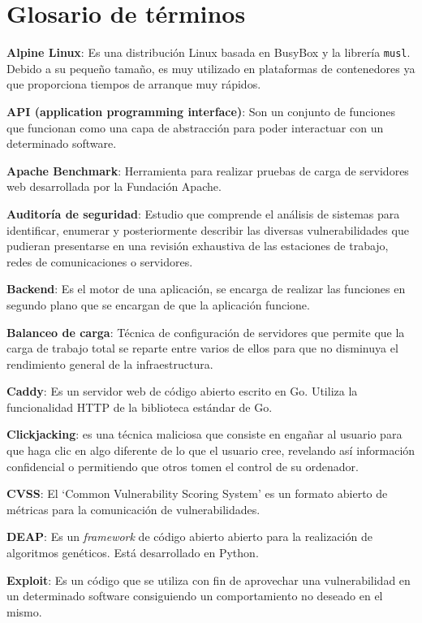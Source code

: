 \chapter{Glosario de términos}

\textbf{Alpine Linux}: Es una distribución Linux basada en BusyBox y la librería \texttt{musl}. Debido a su pequeño tamaño, es muy utilizado en plataformas de contenedores ya que proporciona tiempos de arranque muy rápidos.
\bigskip

\textbf{API (application programming interface)}: Son un conjunto de funciones que funcionan como una capa de abstracción para poder interactuar con un determinado software.
\bigskip

\textbf{Apache Benchmark}: Herramienta para realizar pruebas de carga de servidores web desarrollada por la Fundación Apache.
\bigskip

\textbf{Auditoría de seguridad}: Estudio que comprende el análisis de sistemas para identificar, enumerar y posteriormente describir las diversas vulnerabilidades que pudieran presentarse en una revisión exhaustiva de las estaciones de trabajo, redes de comunicaciones o servidores.
\bigskip

\textbf{Backend}: Es el motor de una aplicación, se encarga de realizar las funciones en segundo plano que se encargan de que la aplicación funcione.
\bigskip

\textbf{Balanceo de carga}: Técnica de configuración de servidores que permite que la carga de trabajo total se reparte entre varios de ellos para que no disminuya el rendimiento general de la infraestructura.
\bigskip

\textbf{Caddy}: Es un servidor web de código abierto escrito en Go. Utiliza la funcionalidad HTTP de la biblioteca estándar de Go.
\bigskip

\textbf{Clickjacking}: es una técnica maliciosa que consiste en engañar al usuario para que haga clic en algo diferente de lo que el usuario cree, revelando así información confidencial o permitiendo que otros tomen el control de su ordenador.
\bigskip

\textbf{CVSS}: El `Common Vulnerability Scoring System' es un formato abierto de métricas para la comunicación de vulnerabilidades.
\bigskip

\textbf{DEAP}: Es un \textit{framework} de código abierto abierto para la realización de algoritmos genéticos. Está desarrollado en Python.
\bigskip

\textbf{Exploit}: Es un código que se utiliza con fin de aprovechar una vulnerabilidad en un determinado software consiguiendo un comportamiento no deseado en el mismo.
\bigskip

